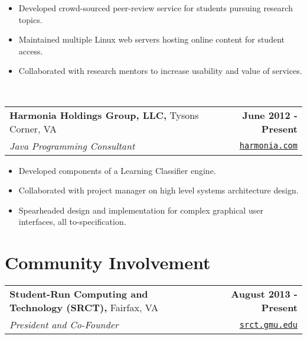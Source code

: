 \documentclass[letterpaper]{article}
\newenvironment{details}
{\begin{itemize}}
{\end{itemize}}
\begin{document}
  \begin{details}
  \item Developed crowd-sourced peer-review service for students pursuing research topics.
  \item Maintained multiple Linux web servers hosting online content for student access.
  \item Collaborated with research mentors to increase usability and value of services.
  \end{details}~\\[0.1em]

  \noindent
  \begin{tabularx}{\textwidth}{@{}X r@{}}
    \textbf{Harmonia Holdings Group, LLC,} Tysons Corner, VA & \textbf{June 2012 - Present} \\
    \emph{Java Programming Consultant} & \texttt{\href{harmonia.com}{harmonia.com}} \\[0.2cm]
  \end{tabularx}

  \begin{details}
  \item Developed components of a Learning Classifier engine.
  \item Collaborated with project manager on high level systems architecture design.
  \item Spearheaded design and implementation for complex graphical user interfaces, all to-specification.
  \end{details}

%


  \section{Community Involvement}
  \noindent
  \begin{tabularx}{\textwidth}{@{}X r@{}}
    \textbf{Student-Run Computing and Technology (SRCT),} Fairfax, VA & \textbf{August 2013 - Present} \\
    \emph{President and Co-Founder} & \texttt{\href{srct.gmu.edu}{srct.gmu.edu}} \\[0.2cm]
  \end{tabularx}
\end{document}
